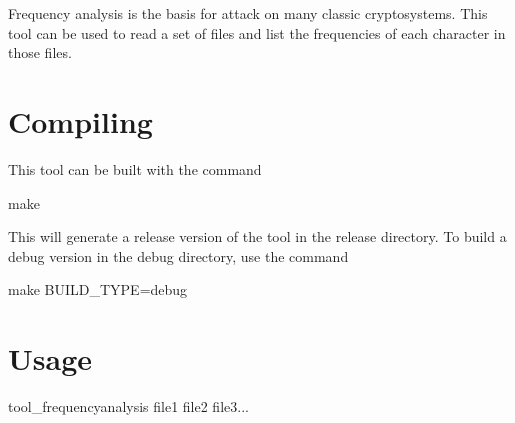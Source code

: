 Frequency analysis is the basis for attack on many classic cryptosystems. This tool can be used to read a set of files and list the frequencies of each character in those files.\hypertarget{frequency_compile_freq}{}\section{Compiling}\label{frequency_compile_freq}
This tool can be built with the command \begin{DoxyVerb}make
\end{DoxyVerb}
 This will generate a release version of the tool in the release directory. To build a debug version in the debug directory, use the command \begin{DoxyVerb}make BUILD_TYPE=debug
\end{DoxyVerb}
\hypertarget{frequency_usage_freq}{}\section{Usage}\label{frequency_usage_freq}
\begin{DoxyVerb}tool_frequencyanalysis file1 file2 file3...
\end{DoxyVerb}
 
